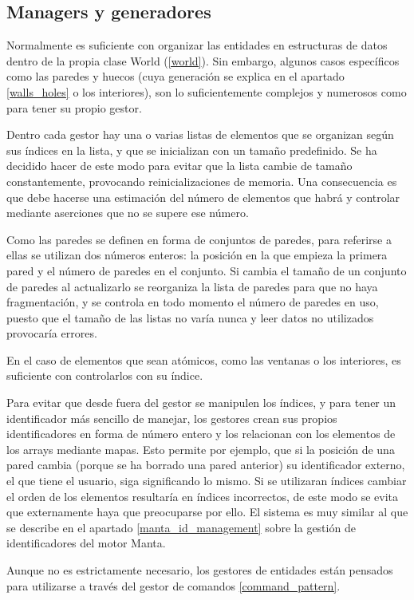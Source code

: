 \subsection{Managers y generadores}
Normalmente es suficiente con organizar las entidades en estructuras de datos dentro de la propia clase World (\ref{world}). Sin embargo, algunos casos específicos como las paredes y huecos (cuya generación se explica en el apartado \ref{walls_holes} o los interiores), son lo suficientemente complejos y numerosos como para tener su propio gestor.

Dentro cada gestor hay una o varias listas de elementos que se organizan según sus índices en la lista, y que se inicializan con un tamaño predefinido. Se ha decidido hacer de este modo para evitar que la lista cambie de tamaño constantemente, provocando reinicializaciones de memoria. Una consecuencia es que debe hacerse una estimación del número de elementos que habrá y controlar mediante aserciones que no se supere ese número. 

Como las paredes se definen en forma de conjuntos de paredes, para referirse a ellas se utilizan dos números enteros: la posición en la que empieza la primera pared y el número de paredes en el conjunto. Si cambia el tamaño de un conjunto de paredes al actualizarlo se reorganiza la lista de paredes para que no haya fragmentación, y se controla en todo momento el número de paredes en uso, puesto que el tamaño de las listas no varía nunca y leer datos no utilizados provocaría errores.

En el caso de elementos que sean atómicos, como las ventanas o los interiores, es suficiente con controlarlos con su índice.

Para evitar que desde fuera del gestor se manipulen los índices, y para tener un identificador más sencillo de manejar, los gestores crean sus propios identificadores en forma de número entero y los relacionan con los elementos de los arrays mediante mapas. Esto permite por ejemplo, que si la posición de una pared cambia (porque se ha borrado una pared anterior) su identificador externo, el que tiene el usuario, siga significando lo mismo. Si se utilizaran índices cambiar el orden de los elementos resultaría en índices incorrectos, de este modo se evita que externamente haya que preocuparse por ello. El sistema es muy similar al que se describe en el apartado \ref{manta_id_management} sobre la gestión de identificadores del motor Manta.

Aunque no es estrictamente necesario, los gestores de entidades están pensados para utilizarse a través del gestor de comandos \ref{command_pattern}.

